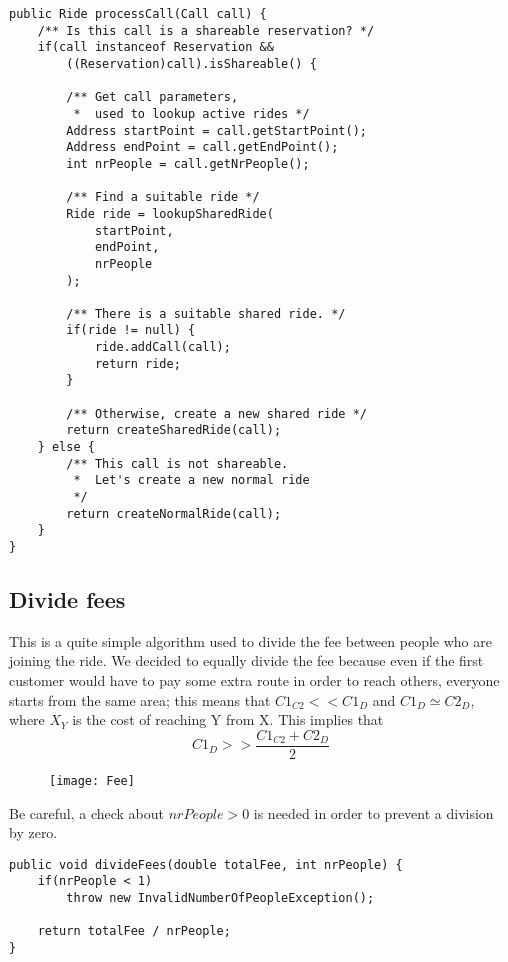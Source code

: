 \begin{lstlisting}[caption={processCall()}]
public Ride processCall(Call call) {
    /** Is this call is a shareable reservation? */
    if(call instanceof Reservation && 
        ((Reservation)call).isShareable() {

        /** Get call parameters, 
         *  used to lookup active rides */
        Address startPoint = call.getStartPoint();
        Address endPoint = call.getEndPoint();
        int nrPeople = call.getNrPeople();

        /** Find a suitable ride */
        Ride ride = lookupSharedRide(
            startPoint, 
            endPoint, 
            nrPeople
        );

        /** There is a suitable shared ride. */
        if(ride != null) {
            ride.addCall(call);
            return ride;
        }
        
        /** Otherwise, create a new shared ride */
        return createSharedRide(call);
    } else {
        /** This call is not shareable. 
         *  Let's create a new normal ride
         */
        return createNormalRide(call); 
    }
}
\end{lstlisting}
\pagebreak
\subsection{Divide fees}
This is a quite simple algorithm used to divide the fee between 
people who are joining the ride. We decided to equally divide the fee
because even if the first customer would have to pay some extra route
in order to reach others, everyone starts from the same area; this means
that $C1_{C2} << C1_D$ and $C1_D \simeq C2_D$, where $X_Y$ is the cost of reaching Y from X. This implies that
\begin{equation}
    C1_D >> \frac{C1_{C2} + C2_D}{2}
\end{equation}

\begin{figure}[h!]
    \centering
    \texttt{[image: Fee]}
\end{figure}

Be careful, a check about $ nrPeople > 0 $ is needed in order to prevent
a division by zero.

\begin{lstlisting}[caption={Divide fees between partecipants}]
public void divideFees(double totalFee, int nrPeople) {
    if(nrPeople < 1)
        throw new InvalidNumberOfPeopleException();

    return totalFee / nrPeople;
}
\end{lstlisting}
